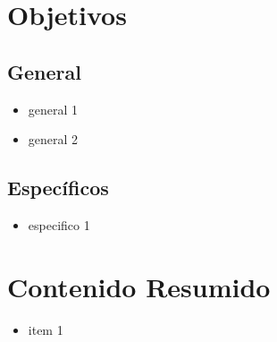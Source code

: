 \documentclass[11pt]{article}
\begin{document}
\section*{Objetivos}

\subsection*{General}

\begin{itemize}
\item general 1 \item general 2 
\end{itemize}

\subsection*{Específicos}

\begin{itemize}
\item especifico 1 
\end{itemize}

\section*{Contenido Resumido}

\begin{itemize}
\item item 1 
\end{itemize}

\end{document}
